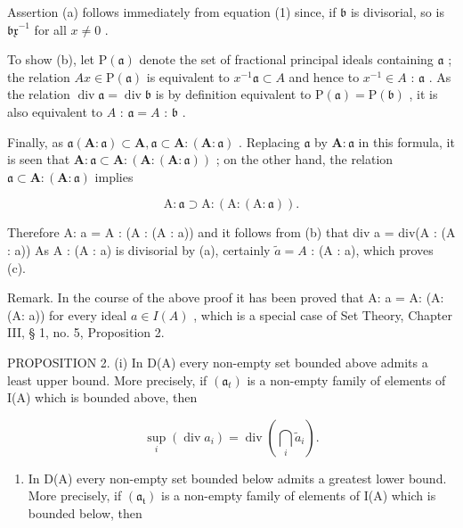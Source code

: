 Assertion (a) follows immediately from equation (1) since, if \(\mathfrak{b}\) is divisorial, so is \(\mathfrak{bx}^{-1}\) for all \(x \neq 0\) .

To show (b), let \(\mathrm{P}(\mathfrak{a})\) denote the set of fractional principal ideals containing \(\mathfrak{a}\) ; the relation \(Ax \in \mathrm{P}(\mathfrak{a})\) is equivalent to \(x^{-1}\mathfrak{a} \subset A\) and hence to \(x^{-1} \in A\) : \(\mathfrak{a}\) . As the relation \(\operatorname{div} \mathfrak{a} = \operatorname{div} \mathfrak{b}\) is by definition equivalent to \(\mathrm{P}(\mathfrak{a}) = \mathrm{P}(\mathfrak{b})\) , it is also equivalent to \(A\) : \(\mathfrak{a} = A\) : \(\mathfrak{b}\) .

Finally, as \(\mathfrak{a}(\mathbf{A}:\mathfrak{a})\subset \mathbf{A},\mathfrak{a}\subset \mathbf{A}:(\mathbf{A}:\mathfrak{a})\) . Replacing \(\mathfrak{a}\) by \(\mathbf{A}:\mathfrak{a}\) in this formula, it is seen that \(\mathbf{A}:\mathfrak{a}\subset \mathbf{A}:(\mathbf{A}:(\mathbf{A}:\mathfrak{a}))\) ; on the other hand, the relation \(\mathfrak{a}\subset \mathbf{A}:(\mathbf{A}:\mathfrak{a})\) implies

\[
\mathrm{A}: \mathfrak {a} \supset \mathrm{A}: (\mathrm{A}: (\mathrm{A}: \mathfrak {a})).
\]

Therefore A: a = A : (A : (A : a)) and it follows from (b) that div a = div(A : (A : a)) As A : (A : a) is divisorial by (a), certainly \(\tilde{a} = A\) : (A : a), which proves (c).

Remark. In the course of the above proof it has been proved that A: a = A: (A: (A: a)) for every ideal \(a \in I(A)\) , which is a special case of Set Theory, Chapter III, § 1, no. 5, Proposition 2.

PROPOSITION 2. (i) In D(A) every non-empty set bounded above admits a least upper bound. More precisely, if \((\mathfrak{a}_t)\) is a non-empty family of elements of I(A) which is bounded above, then

\[
\sup _ {i} (\operatorname{div} a _ {i}) = \operatorname{div} \left(\bigcap_ {i} \tilde {a} _ {i}\right).
\]

\begin{enumerate}
\def\labelenumi{(\roman{enumi})}
\setcounter{enumi}{1}
\tightlist
\item
  In D(A) every non-empty set bounded below admits a greatest lower bound. More precisely, if \((\mathfrak{a}_{\mathfrak{t}})\) is a non-empty family of elements of I(A) which is bounded below, then
\end{enumerate}

